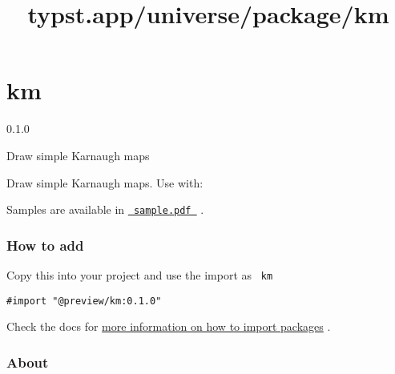\title{typst.app/universe/package/km}

\label{banner}
\section{km}\label{km}

{ 0.1.0 }

Draw simple Karnaugh maps

\label{readme}
Draw simple Karnaugh maps. Use with:

\begin{Shaded}
\begin{Highlighting}[]

\NormalTok{  ),}
\NormalTok{  (}
\NormalTok{  )}
\NormalTok{)}
\end{Highlighting}
\end{Shaded}

Samples are available in
\href{https://github.com/typst/packages/blob/main/packages/preview/km/0.1.0/sample.pdf}{\texttt{\ sample.pdf\ }}
.

\subsubsection{How to add}\label{how-to-add}

Copy this into your project and use the import as \texttt{\ km\ }

\begin{verbatim}
#import "@preview/km:0.1.0"
\end{verbatim}



Check the docs for
\href{https://typst.app/docs/reference/scripting/\#packages}{more
information on how to import packages} .

\subsubsection{About}\label{about}

